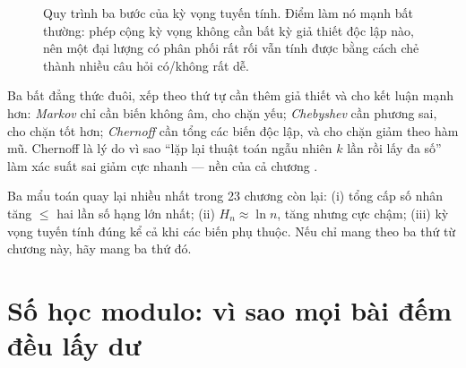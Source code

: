 \documentclass[../../algorithm.tex]{subfiles}
\begin{document}
\begin{figure}[H]\centering
{}
\caption{Quy trình ba bước của kỳ vọng tuyến tính. Điểm làm nó mạnh bất thường: phép cộng kỳ vọng không cần bất kỳ giả thiết độc lập nào, nên một đại lượng có phân phối rất rối vẫn tính được bằng cách chẻ thành nhiều câu hỏi có/không rất dễ.}
\label{fig:linearity}
\end{figure}

Ba bất đẳng thức đuôi, xếp theo thứ tự cần thêm giả thiết và cho kết luận mạnh hơn: \emph{Markov} chỉ cần biến không âm, cho chặn yếu; \emph{Chebyshev} cần phương sai, cho chặn tốt hơn; \emph{Chernoff} cần tổng các biến độc lập, và cho chặn giảm theo hàm mũ. Chernoff là lý do vì sao ``lặp lại thuật toán ngẫu nhiên \(k\) lần rồi lấy đa số'' làm xác suất sai giảm cực nhanh --- nền của cả chương .

\begin{cannho}
Ba mẩu toán quay lại nhiều nhất trong 23 chương còn lại: (i) tổng cấp số nhân tăng \(\le\) hai lần số hạng lớn nhất; (ii) \(H_n \approx \ln n\), tăng nhưng cực chậm; (iii) kỳ vọng tuyến tính đúng kể cả khi các biến phụ thuộc. Nếu chỉ mang theo ba thứ từ chương này, hãy mang ba thứ đó.
\end{cannho}

\section{Số học modulo: vì sao mọi bài đếm đều lấy dư}
\end{document}
